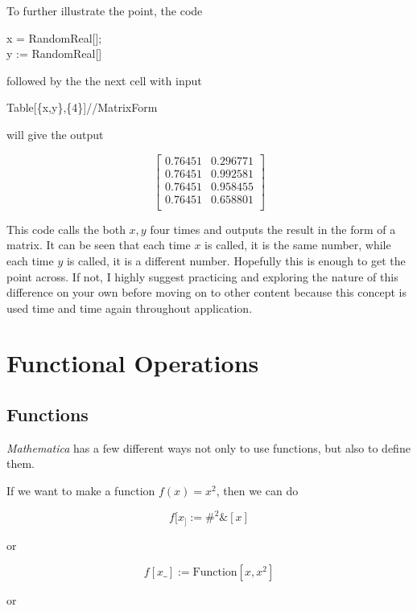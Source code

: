 \documentclass[11pt,letterpaper,twoside,titlepage]{book}
\newcommand{\Mathematica}{\textit{Mathematica} }
\begin{document}
				To further illustrate the point, the code
				
				\begin{center}
					x = RandomReal[]; \\
					y := RandomReal[]
				\end{center}
				
				followed by the the next cell with input
				
				\begin{center}
					Table[\{x,y\},\{4\}]//MatrixForm
				\end{center}
				
				will give the output
				
				\[ \left[
\begin{array}{cc}
 0.76451 & 0.296771 \\
 0.76451 & 0.992581 \\
 0.76451 & 0.958455 \\
 0.76451 & 0.658801 \\
\end{array}
\right]
\]

				This code calls the both $x,y$ four times and outputs the result in the form of a matrix.  It can be seen that each time $x$ is called, it is the same number, while each time $y$ is called, it is a different number.  Hopefully this is enough to get the point across.  If not, I highly suggest practicing and exploring the nature of this difference on your own before moving on to other content because this concept is used time and time again throughout application.
		
		\chapter{Functional Operations}
		
			\section{Functions}
		
				\Mathematica has a few different ways not only to use functions, but also to define them.  
				
				If we want to make a function $f(x) = x^2$, then we can do
				
				\[ f[x_]:= \#^2 \&[x] \]
				
				or 
				
				\[ f[x\_]:= \text{Function}[x,x^2] \]
				
				or
				
\end{document}
